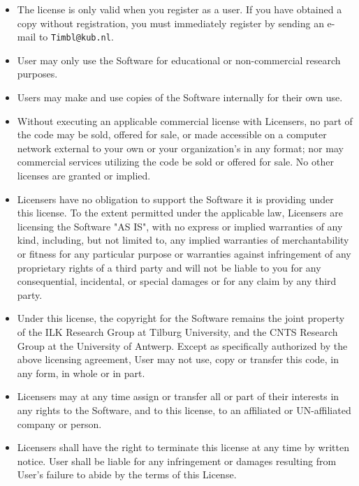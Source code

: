 \documentclass{report}
\begin{document}
\begin{itemize}

\item The license is only valid when you register as a user. If you
have obtained a copy without registration, you must immediately
register by sending an e-mail to {\tt Timbl@kub.nl}.

\item User may only use the Software for educational or non-commercial
research purposes.

\item Users may make and use copies of the Software internally for
their own use.

\item Without executing an applicable commercial license with
Licensers, no part of the code may be sold, offered for sale, or made
accessible on a computer network external to your own or your
organization's in any format; nor may commercial services utilizing
the code be sold or offered for sale. No other licenses are granted or
implied.

\item Licensers have no obligation to support the Software it is
providing under this license.  To the extent permitted under the
applicable law, Licensers are licensing the Software "AS IS", with no
express or implied warranties of any kind, including, but not limited
to, any implied warranties of merchantability or fitness for any
particular purpose or warranties against infringement of any
proprietary rights of a third party and will not be liable to you for
any consequential, incidental, or special damages or for any claim by
any third party.

\item Under this license, the copyright for the Software remains the
joint property of the ILK Research Group at Tilburg University, and
the CNTS Research Group at the University of Antwerp.  Except as
specifically authorized by the above licensing agreement, User may not
use, copy or transfer this code, in any form, in whole or in part.

\item Licensers may at any time assign or transfer all or part of their
interests in any rights to the Software, and to this license, to an
affiliated or UN-affiliated company or person.

\item Licensers shall have the right to terminate this license at any
time by written notice. User shall be liable for any infringement or
damages resulting from User's failure to abide by the terms of this
License.


\end{itemize}
\end{document}

